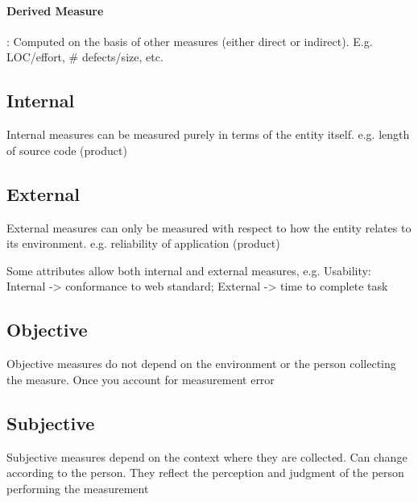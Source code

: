 \paragraph{Derived Measure}: Computed on the basis of other measures (either direct or
indirect). E.g. LOC/effort, \# defects/size, etc.




\begin{flushleft}
  \begin{minipage}[t]{0.45\linewidth}
    \raggedright
    \subsection{Internal}

    Internal measures can be measured purely in terms of the
    entity itself. e.g. length of source code (product)

  \end{minipage}%
  \hfill
  \begin{minipage}[t]{0.45\linewidth}
    \raggedright

    \subsection{External}

    External measures can only be measured with respect to
    how the entity relates to its environment. e.g. reliability of application (product)

  \end{minipage}
\end{flushleft}

Some attributes allow both internal and external measures,
e.g. Usability: Internal -> conformance to web standard;
External -> time to complete task

\begin{flushleft}
  \begin{minipage}[t]{0.45\linewidth}
    \raggedright
    \subsection{Objective}

    Objective measures do not depend on the environment or
    the person collecting the measure. Once you account for measurement error

  \end{minipage}%
  \hfill
  \begin{minipage}[t]{0.45\linewidth}
    \raggedright

    \subsection{Subjective}

    Subjective measures depend on the context where they are
    collected. Can change according to the person. They reflect the perception and judgment of the person
    performing the measurement
  \end{minipage}
\end{flushleft}


